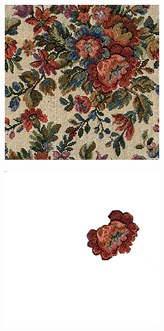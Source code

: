 \begin{figure}[]
\begin{subfigure}{\textwidth}
        \begin{subfigure}{0.24\textwidth}
            \centering
            \includegraphics[width=\textwidth]{images/04-experiment01/flowers/target.jpg}
        \end{subfigure}
        \hfill
        \begin{subfigure}{0.24\textwidth}
            \centering
            \includegraphics[width=\textwidth]{images/04-experiment01/flowers/one_bg.jpg}

\end{subfigure}
\end{subfigure}
\end{figure}
